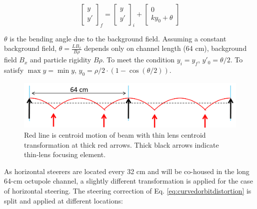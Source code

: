 \begin{equation}
\begin{bmatrix} y \\ y' \end{bmatrix}_f = \begin{bmatrix} y \\ y' \end{bmatrix}_i + \begin{bmatrix} 0 \\ ky_0 + \theta \end{bmatrix}
\label{eq:curvedorbitdistortion}
\end{equation}

$\theta$ is the bending angle due to the background field. Assuming a constant background field, $\theta = \frac{LB_x}{B \rho}$ depends only on channel length (64 cm), background field $B_x$ and particle rigidity $B \rho$. To meet the condition $y_i=y_f$, $y'_0 = \theta/2$. To satisfy $\max{y}=\min{y}$, $y_0=\rho/2 \cdot ( 1-\cos{(\theta/2)} )$.    

\begin{figure}
\centering
\includegraphics[width=\textwidth]{7.figures/steeringtolerance/horz_bg_field_distortion_cartoon.png}
\caption{Red line is centroid motion of beam with thin lens centroid transformation at thick red arrows. Thick black arrows indicate thin-lens focusing element.}
\label{fig:horzcurvedorbitdistortion}
\end{figure}

As horizontal steerers are located every 32 cm and will be co-housed in the long 64-cm octupole channel, a slightly different transformation is applied for the case of horizontal steering. The steering correction of Eq. \ref{eq:curvedorbitdistortion} is split and applied at different locations: 

